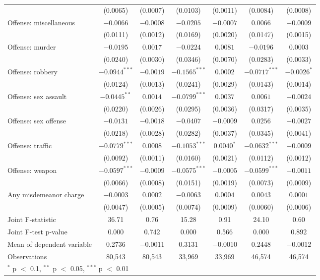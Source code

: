 \begin{tabular}{lcccccc}
 & (0.0065) & (0.0007) & (0.0103) & (0.0011) & (0.0084) & (0.0008) \\
Offense: miscellaneous & $-0.0066$ & $-0.0008$ & $-0.0205$ & $-0.0007$ & $0.0066$ & $-0.0009$ \\
 & (0.0111) & (0.0012) & (0.0169) & (0.0020) & (0.0147) & (0.0015) \\
Offense: murder & $-0.0195$ & $0.0017$ & $-0.0224$ & $0.0081$ & $-0.0196$ & $0.0003$ \\
 & (0.0240) & (0.0030) & (0.0346) & (0.0070) & (0.0283) & (0.0033) \\
Offense: robbery & $-0.0944^{***}$ & $-0.0019$ & $-0.1565^{***}$ & $0.0002$ & $-0.0717^{***}$ & $-0.0026^{*}$ \\
 & (0.0124) & (0.0013) & (0.0241) & (0.0029) & (0.0143) & (0.0014) \\
Offense: sex assault & $-0.0445^{**}$ & $0.0014$ & $-0.0799^{***}$ & $0.0037$ & $0.0061$ & $-0.0024$ \\
 & (0.0220) & (0.0026) & (0.0295) & (0.0036) & (0.0317) & (0.0035) \\
Offense: sex offense & $-0.0131$ & $-0.0018$ & $-0.0407$ & $-0.0009$ & $0.0256$ & $-0.0027$ \\
 & (0.0218) & (0.0028) & (0.0282) & (0.0037) & (0.0345) & (0.0041) \\
Offense: traffic & $-0.0779^{***}$ & $0.0008$ & $-0.1053^{***}$ & $0.0040^{*}$ & $-0.0632^{***}$ & $-0.0009$ \\
 & (0.0092) & (0.0011) & (0.0160) & (0.0021) & (0.0112) & (0.0012) \\
Offense: weapon & $-0.0597^{***}$ & $-0.0009$ & $-0.0575^{***}$ & $-0.0005$ & $-0.0599^{***}$ & $-0.0011$ \\
 & (0.0066) & (0.0008) & (0.0151) & (0.0019) & (0.0073) & (0.0009) \\
Any misdemeanor charge & $-0.0003$ & $0.0002$ & $-0.0063$ & $0.0004$ & $0.0043$ & $0.0001$ \\
 & (0.0047) & (0.0005) & (0.0074) & (0.0009) & (0.0060) & (0.0006) \\
\midrule
Joint F-statistic & 36.71 & 0.76 & 15.28 & 0.91 & 24.10 & 0.60 \\
Joint F-test p-value & 0.000 & 0.742 & 0.000 & 0.566 & 0.000 & 0.892 \\
Mean of dependent variable & 0.2736 & $-$0.0011 & 0.3131 & $-$0.0010 & 0.2448 & $-$0.0012 \\
Observations & 80,543 & 80,543 & 33,969 & 33,969 & 46,574 & 46,574 \\
\bottomrule
\multicolumn{7}{l}{\footnotesize $^{*}$ p $<$ 0.1, $^{**}$ p $<$ 0.05, $^{***}$ p $<$ 0.01} \\
\end{tabular}
